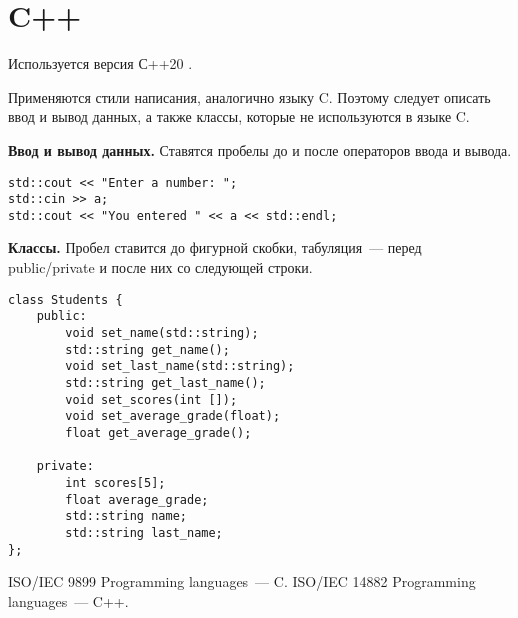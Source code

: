 \documentclass{article}
\begin{document}
\section{C++}
Используется версия С++20 \cite{C++}.\vspace{5mm}

Применяются стили написания, аналогично языку C. Поэтому следует описать ввод и вывод данных, а также классы, которые не используются в языке C.\par
\textbf{Ввод и вывод данных.} Ставятся пробелы до и после операторов ввода и вывода.
\begin{lstlisting}[caption=Ввод и вывод данных.]
std::cout << "Enter a number: ";
std::cin >> a;
std::cout << "You entered " << a << std::endl;
\end{lstlisting}

\textbf{Классы.} Пробел ставится до фигурной скобки, табуляция~--- перед public/private и после них со следующей строки.
\begin{lstlisting}[caption=Классы.]
class Students {
    public:
        void set_name(std::string);
        std::string get_name();
        void set_last_name(std::string);
        std::string get_last_name();
        void set_scores(int []);
        void set_average_grade(float);
        float get_average_grade();

    private:
        int scores[5];
        float average_grade;
        std::string name;
        std::string last_name;
};
\end{lstlisting}

\begin{thebibliography}{}
ISO/IEC 9899 Programming languages~--- C.
ISO/IEC 14882 Programming languages~--- C++.
\end{thebibliography}
\end{document}
